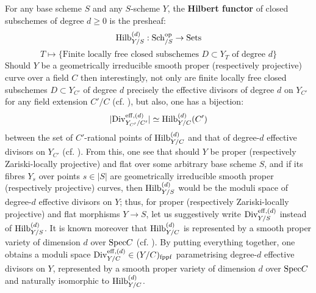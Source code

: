         \begin{remark} \label{remark: moduli_space_of_effective_divisors}
            For any base scheme $S$ and any $S$-scheme $Y$, the \textbf{Hilbert functor} of closed subschemes of degree $d \geq 0$ is the presheaf:
                $$\mathrm{Hilb}_{Y/S}^{(d)}: \mathrm{Sch}_{/S}^{\mathrm{op}} \to \mathrm{Sets}$$
                $$T \mapsto \{\text{Finite locally free closed subschemes $D \subset Y_T$ of degree $d$}\}$$
            Should $Y$ be a geometrically irreducible smooth proper (respectively projective) curve over a field $C$ then interestingly, not only are finite locally free closed subschemes $D \subset Y_{C'}$ of degree $d$ precisely the effective divisors of degree $d$ on $Y_{C'}$ for any field extension $C'/C$ (cf. \cite[\href{https://stacks.math.columbia.edu/tag/0B9D}{Tag 0B9D}]{stacks}), but also, one has a bijection:
                $$|\mathrm{Div}_{Y_{C'}/C'}^{\mathrm{eff}, (d)}| \simeq \mathrm{Hilb}_{Y/C}^{(d)}(C')$$
            between the set of $C'$-rational points of $\mathrm{Hilb}_{Y/C}^{(d)}$ and that of degree-$d$ effective divisors on $Y_{C'}$ (cf. \cite[\href{https://stacks.math.columbia.edu/tag/0B9I}{Tag 0B9I}]{stacks}). From this, one see that should $Y$ be proper (respectively Zariski-locally projective) and flat over some arbitrary base scheme $S$, and if its fibres $Y_s$ over points $s \in |S|$ are geometrically irreducible smooth proper (respectively projective) curves, then $\mathrm{Hilb}_{Y/S}^{(d)}$ would be the moduli space of degree-$d$ effective divisors on $Y$; thus, for proper (respectively Zariski-locally projective) and flat morphisms $Y \to S$, let us suggestively write $\mathrm{Div}_{Y/S}^{\mathrm{eff}, (d)}$ instead of $\mathrm{Hilb}_{Y/S}^{(d)}$. It is known moreover that $\mathrm{Hilb}_{Y/C}^{(d)}$ is represented by a smooth proper variety of dimension $d$ over $\mathrm{Spec} C$ (cf. \cite[\href{https://stacks.math.columbia.edu/tag/0B9I}{Tag 0B9I}]{stacks}). By putting everything together, one obtains a moduli space $\mathrm{Div}_{Y/C}^{\mathrm{eff}, (d)} \in (Y/C)_{\mathrm{fppf}}$ parametrising degree-$d$ effective divisors on $Y$, represented by a smooth proper variety of dimension $d$ over $\mathrm{Spec} C$ and naturally isomorphic to $\mathrm{Hilb}_{Y/C}^{(d)}$.
        \end{remark}
        
